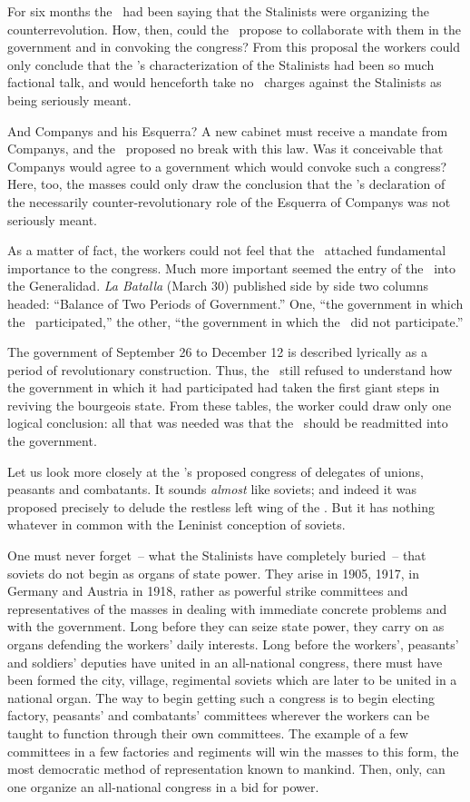 For six months the \POUM\ had been saying that the Stalinists were organizing the counterrevolution. How, then, could the \POUM\ propose to collaborate with them in the government and in convoking the congress? From this proposal the workers could only conclude that the \POUM’s characterization of the Stalinists had been so much factional talk, and would henceforth take no \POUM\ charges against the Stalinists as being seriously meant.

And Companys and his Esquerra? A new cabinet must receive a mandate from Companys, and the \POUM\ proposed no break with this law. Was it conceivable that Companys would agree to a government which would convoke such a congress? Here, too, the masses could only draw the conclusion that the \POUM’s declaration of the necessarily counter-revolutionary role of the Esquerra of Companys was not seriously meant.

As a matter of fact, the workers could not feel that the \POUM\ attached fundamental importance to the congress. Much more important seemed the entry of the \POUM\ into the Generalidad. \emph{La Batalla} (March 30) published side by side two columns headed: ``Balance of Two Periods of Government.'' One, ``the government in which the \POUM\ participated,'' the other, ``the government in which the \POUM\ did not participate.''

The government of September 26 to December 12 is described lyrically as a period of revolutionary construction. Thus, the \POUM\ still refused to understand how the government in which it had participated had taken the first giant steps in reviving the bourgeois state. From these tables, the worker could draw only one logical conclusion: all that was needed was that the \POUM\ should be readmitted into the government.

Let us look more closely at the \POUM’s proposed congress of delegates of unions, peasants and combatants. It sounds \emph{almost} like soviets; and indeed it was proposed precisely to delude the restless left wing of the \POUM\kn. But it has nothing whatever in common with the Leninist conception of soviets.

One must never forget~-- what the Stalinists have completely bu\-ried~-- that soviets do not begin as organs of state power. They arise in 1905, 1917, in Germany and Austria in 1918, rather as powerful strike committees and representatives of the masses in dealing with immediate concrete problems and with the government. Long before they can seize state power, they carry on as organs defending the workers’ daily interests. Long before the workers’, peasants’ and soldiers' deputies have united in an all-national congress, there must have been formed the city, village, regimental soviets which are later to be united in a national organ. The way to begin getting such a congress is to begin electing factory, peasants’ and combatants’ committees wherever the workers can be taught to function through their own committees. The example of a few committees in a few factories and regiments will win the masses to this form, the most democratic method of representation known to mankind. Then, only, can one organize an all-national congress in a bid for power.
\noclub

